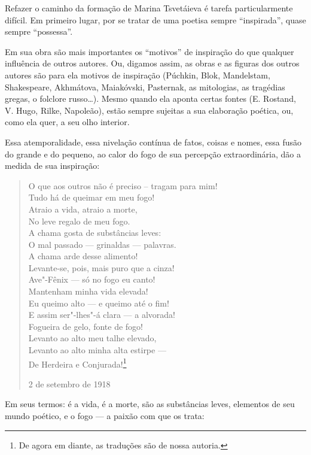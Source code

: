 Refazer o caminho da formação de Marina Tsvetáieva é tarefa
particularmente difícil. Em primeiro lugar, por se tratar de
uma poetisa sempre ``inspirada'', quase sempre ``possessa''.

Em sua obra são mais importantes os ``motivos'' de inspiração do
que qualquer influência de outros autores. Ou, digamos assim, as
obras e as figuras dos outros autores são para ela motivos de
inspiração (Púchkin, Blok, Mandelstam, Shakespeare, Akhmátova,
Maiakóvski, Pasternak, as mitologias, as tragédias gregas, o
folclore russo\ldots{}). Mesmo quando ela aponta certas fontes
(E. Rostand, V. Hugo, Rilke, Napoleão), estão sempre sujeitas a
sua elaboração poética, ou, como ela quer, a seu olho interior.

Essa atemporalidade, essa nivelação contínua de fatos, coisas e
nomes, essa fusão do grande e do pequeno, ao calor do fogo de sua
percepção extraordinária, dão a medida de sua inspiração:

\begin{verse}
O que aos outros não é preciso -- tragam \qb{}para mim! \\
Tudo há de queimar em meu fogo! \\
Atraio a vida, atraio a morte, \\
No leve regalo de meu fogo. \\[8pt]
A chama gosta de substâncias leves: \\
O mal passado --- grinaldas --- palavras. \\
A chama arde desse alimento! \\
Levante-se, pois, mais puro que a cinza! \\[8pt]
Ave"-Fênix --- só no fogo eu canto! \\
Mantenham minha vida elevada! \\
Eu queimo alto --- e queimo até o fim! \\
E assim ser"-lhes"-á clara --- a alvorada! \\[8pt]
Fogueira de gelo, fonte de fogo! \\
Levanto ao alto meu talhe elevado, \\
Levanto ao alto minha alta estirpe --- \\
De Herdeira e Conjurada!\footnote{De agora em diante, as traduções são de nossa autoria.}

2 de setembro de 1918

\end{verse}

Em seus termos: é a vida, é a morte, são as substâncias leves,
elementos de seu mundo poético, e o fogo --- a paixão com que os
trata:

